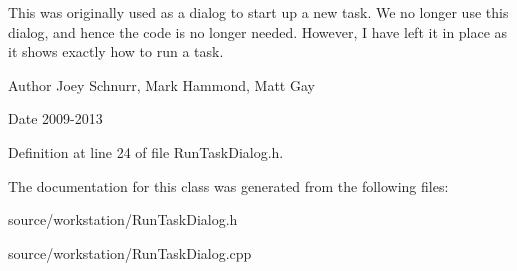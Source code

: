This was originally used as a dialog to start up a new task. We no longer use this dialog, and hence the code is no longer needed. However, I have left it in place as it shows exactly how to run a task. \begin{DoxyAuthor}{Author}
Joey Schnurr, Mark Hammond, Matt Gay 
\end{DoxyAuthor}
\begin{DoxyDate}{Date}
2009-\/2013 
\end{DoxyDate}


Definition at line 24 of file Run\-Task\-Dialog.\-h.



The documentation for this class was generated from the following files\-:\begin{DoxyCompactItemize}
\item 
source/workstation/Run\-Task\-Dialog.\-h\item 
source/workstation/Run\-Task\-Dialog.\-cpp\end{DoxyCompactItemize}
